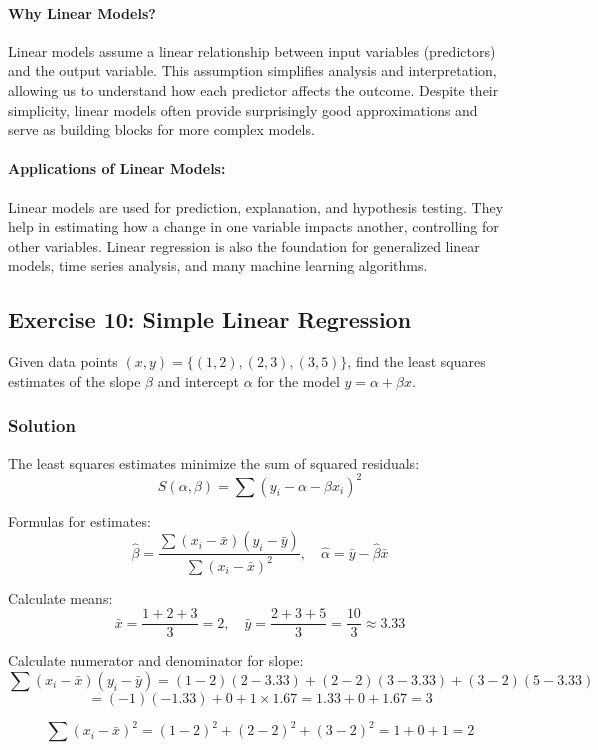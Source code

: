 \documentclass{book}
\begin{document}
\paragraph{Why Linear Models?}
Linear models assume a linear relationship between input variables (predictors) and the output variable. This assumption simplifies analysis and interpretation, allowing us to understand how each predictor affects the outcome. Despite their simplicity, linear models often provide surprisingly good approximations and serve as building blocks for more complex models.

\paragraph{Applications of Linear Models:}
Linear models are used for prediction, explanation, and hypothesis testing. They help in estimating how a change in one variable impacts another, controlling for other variables. Linear regression is also the foundation for generalized linear models, time series analysis, and many machine learning algorithms.

\subsection*{Exercise 10: Simple Linear Regression}
Given data points $(x, y) = \{(1, 2), (2, 3), (3, 5)\}$, find the least squares estimates of the slope $\beta$ and intercept $\alpha$ for the model $y = \alpha + \beta x$.

\subsubsection*{Solution}
The least squares estimates minimize the sum of squared residuals:
\[
S(\alpha, \beta) = \sum (y_i - \alpha - \beta x_i)^2
\]

Formulas for estimates:
\[
\hat{\beta} = \frac{\sum (x_i - \bar{x})(y_i - \bar{y})}{\sum (x_i - \bar{x})^2}, \quad \hat{\alpha} = \bar{y} - \hat{\beta} \bar{x}
\]

Calculate means:
\[
\bar{x} = \frac{1 + 2 + 3}{3} = 2, \quad \bar{y} = \frac{2 + 3 + 5}{3} = \frac{10}{3} \approx 3.33
\]

Calculate numerator and denominator for slope:
\[
\sum (x_i - \bar{x})(y_i - \bar{y}) = (1-2)(2-3.33) + (2-2)(3-3.33) + (3-2)(5-3.33)
\]
\[
= (-1)(-1.33) + 0 + 1 \times 1.67 = 1.33 + 0 + 1.67 = 3
\]

\[
\sum (x_i - \bar{x})^2 = (1-2)^2 + (2-2)^2 + (3-2)^2 = 1 + 0 + 1 = 2
\]
\end{document}
